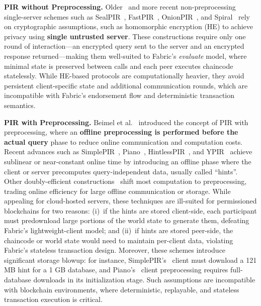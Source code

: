 \documentclass[letterpaper,journal]{IEEEtran}
\begin{document}
\textbf{PIR without Preprocessing.}
Older~\cite{cachin_computationally_1999,gentry_single-database_2005,brakerski_efficient_2011,dong_fast_2014,aguilar-melchor_xpir_2016} and 
more recent non-preprocessing single-server schemes such as SealPIR~\cite{sealpir_2018}, FastPIR~\cite{fastpir_2021}, OnionPIR~\cite{onionpir_2021}, 
and Spiral~\cite{spiral_2022} rely on cryptographic assumptions, such as homomorphic encryption (HE) to achieve privacy 
using \textbf{single untrusted server}. 
These constructions require only one round of interaction—an encrypted query sent to the server and an encrypted response returned—making them 
well-suited to Fabric’s \emph{evaluate} model, where minimal state is preserved between calls and each peer executes chaincode statelessly.  
While HE-based protocols are computationally heavier, they avoid persistent client-specific state and additional communication rounds, 
which are incompatible with Fabric’s endorsement flow and deterministic transaction semantics. 

\textbf{PIR with Preprocessing.}
Beimel et al.~\cite{beimel_reducing_2004} introduced the concept of PIR with preprocessing, where an \textbf{offline preprocessing is 
performed before the actual query} phase to reduce online communication and computation costs.
Recent advances such as SimplePIR~\cite{simplepir_2023}, Piano~\cite{piano_pir_2024}, 
HintlessPIR~\cite{hintless_pir_2024}, and YPIR~\cite{ypir_2024} achieve sublinear or near-constant online time by introducing an offline phase 
where the client or server precomputes query-independent data, usually called ``hints''.
Other doubly-efficient constructions~\cite{depir_ring_lwe_2023, okada_towards_depir_2025, corrigan-gibbs_subpir_2020} 
shift most computation to preprocessing, trading online efficiency for large offline communication or storage.
While appealing for cloud-hosted servers, these techniques are ill-suited for permissioned blockchains for two reasons:
(i)~if the hints are stored client-side, each participant must predownload large portions of the world state to generate them, 
defeating Fabric’s lightweight-client model; and
(ii)~if hints are stored peer-side, the chaincode or world state would need to maintain per-client data, 
violating Fabric’s stateless transaction design.  
Moreover, these schemes introduce significant storage blowup: for instance, SimplePIR's~\cite{simplepir_2023} 
client must download a 121 MB hint for a 1 GB database, and Piano's~\cite{piano_pir_2024} client preprocessing requires full-database 
downloads in its initialization stage. Such assumptions are incompatible with blockchain environments, where deterministic, replayable, 
and stateless transaction execution is critical.
\end{document}
